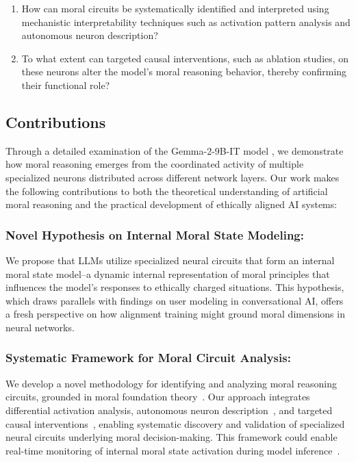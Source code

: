 \documentclass[runninghheads]{llncs}
\begin{document}
\begin{enumerate}
    \item How can moral circuits be systematically identified and interpreted using mechanistic interpretability techniques such as activation pattern analysis and autonomous neuron description?
    \item To what extent can targeted causal interventions, such as ablation studies, on these neurons alter the model's moral reasoning behavior, thereby confirming their functional role?
\end{enumerate}

\subsection{Contributions}

Through a detailed examination of the Gemma-2-9B-IT model \cite{Gemma2024}, we demonstrate how moral reasoning emerges from the coordinated activity of multiple specialized neurons distributed across different network layers. Our work makes the following contributions to both the theoretical understanding of artificial moral reasoning and the practical development of ethically aligned AI systems:

\subsubsection{Novel Hypothesis on Internal Moral State Modeling:}
We propose that LLMs utilize specialized neural circuits that form an internal moral state model--a dynamic internal representation of moral principles that influences the model's responses to ethically charged situations. This hypothesis, which draws parallels with findings on user modeling in conversational AI, offers a fresh perspective on how alignment training might ground moral dimensions in neural networks.

\subsubsection{Systematic Framework for Moral Circuit Analysis:}
We develop a novel methodology for identifying and analyzing moral reasoning circuits, grounded in moral foundation theory~\cite{Haidt2004}. Our approach integrates differential activation analysis, autonomous neuron description~\cite{bills2023language}, and targeted causal interventions~\cite{Yamakoshi2023}, enabling systematic discovery and validation of specialized neural circuits underlying moral decision-making. This framework could enable real-time monitoring of internal moral state activation during model inference~\cite{chen_designing_2024}.
\end{document}

